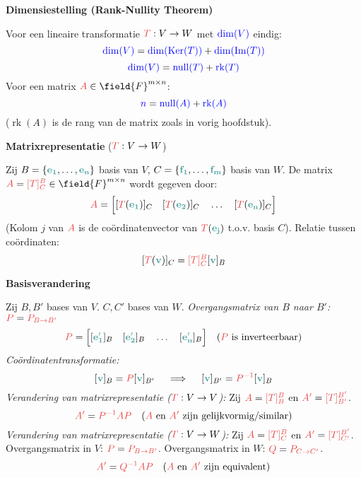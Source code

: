 \documentclass[12pt]{article}
\renewcommand{\vec}[1]{\textcolor{vectorTeal}{\mathbf{#1}}}
\newcommand{\scalar}[1]{\textcolor{scalarBrightBlue}{#1}}
\newcommand{\mat}[1]{\textcolor{matrixSoftRed}{#1}}
\DeclareMathOperator{\Ker}{Ker}
\DeclareMathOperator{\im}{Im} %
\DeclareMathOperator{\Dim}{dim}
\DeclareMathOperator{\rk}{rk}
\DeclareMathOperator{\nullity}{null}
\begin{document}
\vspace{1.5em} %
{\centering
\textcolor{headerBrown}{\large\textbf{Dimensiestelling (Rank-Nullity Theorem)}}
\par
}%
Voor een lineaire transformatie $\mat{T}: V \to W$ met $\scalar{\Dim(V)}$ eindig:
\[
\scalar{\Dim(V)} = \scalar{\Dim(\Ker(T))} + \scalar{\Dim(\im(T))}
\]
\[
\scalar{\Dim(V)} = \scalar{\nullity(T)} + \scalar{\rk(T)}
\]
Voor een matrix $\mat{A} \in \field{F}^{m \times n}$:
\[
\scalar{n} = \scalar{\nullity(A)} + \scalar{\rk(A)}
\]
($\rk(A)$ is de rang van de matrix zoals in vorig hoofdstuk).

\vspace{1.5em} %
{\centering
\textcolor{headerBrown}{\large\textbf{Matrixrepresentatie}} ($\mat{T}: V \to W$)
\par
}%
Zij $B = \{\vec{e_1}, \dots, \vec{e_n}\}$ basis van $V$, $C = \{\vec{f_1}, \dots, \vec{f_m}\}$ basis van $W$.
De matrix $\mat{A} = \mat{[T]_C^B} \in \field{F}^{m \times n}$ wordt gegeven door:
\[
\mat{A} = \Big[ [\mat{T}(\vec{e_1})]_C \quad [\mat{T}(\vec{e_2})]_C \quad \dots \quad [\mat{T}(\vec{e_n})]_C \Big]
\]
(Kolom $j$ van $\mat{A}$ is de coördinatenvector van $\mat{T}(\vec{e_j})$ t.o.v. basis $C$).
Relatie tussen coördinaten:
\[
[\mat{T}(\vec{v})]_C = \mat{[T]_C^B} [\vec{v}]_B
\]

\vspace{1.5em} %
{\centering
\textcolor{headerBrown}{\large\textbf{Basisverandering}}
\par
}%
Zij $B, B'$ bases van $V$. $C, C'$ bases van $W$.
\textit{Overgangsmatrix van $B$ naar $B'$:} $\mat{P} = \mat{P_{B \to B'}}$
\[
\mat{P} = \Big[ [\vec{e'_1}]_B \quad [\vec{e'_2}]_B \quad \dots \quad [\vec{e'_n}]_B \Big] \quad (\mat{P} \text{ is inverteerbaar})
\]
\textit{Coördinatentransformatie:}
\[
[\vec{v}]_B = \mat{P} [\vec{v}]_{B'}
\quad \implies \quad
[\vec{v}]_{B'} = \mat{P^{-1}} [\vec{v}]_B
\]
\textit{Verandering van matrixrepresentatie ($\mat{T}: V \to V$):}
Zij $\mat{A} = \mat{[T]_B^B}$ en $\mat{A'} = \mat{[T]_{B'}^{B'}}$.
\[
\mat{A'} = \mat{P^{-1}} \mat{A} \mat{P} \quad (\mat{A} \text{ en } \mat{A'} \text{ zijn gelijkvormig/similar})
\]
\textit{Verandering van matrixrepresentatie ($\mat{T}: V \to W$):}
Zij $\mat{A} = \mat{[T]_C^B}$ en $\mat{A'} = \mat{[T]_{C'}^{B'}}$.
Overgangsmatrix in $V$: $\mat{P} = \mat{P_{B \to B'}}$. Overgangsmatrix in $W$: $\mat{Q} = \mat{P_{C \to C'}}$.
\[
\mat{A'} = \mat{Q^{-1}} \mat{A} \mat{P} \quad (\mat{A} \text{ en } \mat{A'} \text{ zijn equivalent})
\]
\end{document}
